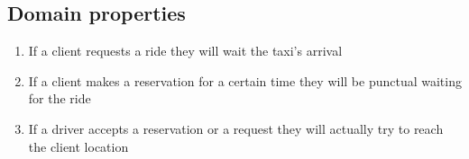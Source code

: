 \documentclass[9pt]{beamer}
\makeatletter
\newcommand*{\currentname}{\@currentlabelname}
\makeatother
\begin{document}
\subsection{Domain properties}
\begin{frame}{\currentname}
\begin{enumerate}[label=\bfseries D\arabic*:]
\item If a client requests a ride they will wait the taxi's arrival
\item If a client makes a reservation for a certain time they will be punctual waiting for the ride
\item If a driver accepts a reservation or a request they will actually try to reach the client location
\end{enumerate}
\end{frame}
\end{document}
